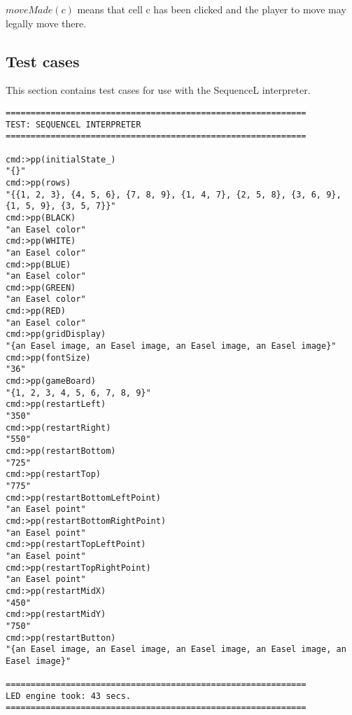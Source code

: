 \documentclass{led_doc}
\begin{document}
\begin{ledCmnt}
$moveMade(c)$ means that cell c has been clicked and the player to move may legally move there.
\end{ledCmnt}

\begin{ledDef}
\end{ledDef}

\begin{ledDef}
\end{ledDef}

\begin{ledDef}
\end{ledDef}

\begin{ledCmnt}
\section{Test cases}

This section contains test cases for use with the SequenceL interpreter.

\begin{verbatim}
============================================================
TEST: SEQUENCEL INTERPRETER
============================================================

cmd:>pp(initialState_)
"{}"
cmd:>pp(rows)
"{{1, 2, 3}, {4, 5, 6}, {7, 8, 9}, {1, 4, 7}, {2, 5, 8}, {3, 6, 9}, {1, 5, 9}, {3, 5, 7}}"
cmd:>pp(BLACK)
"an Easel color"
cmd:>pp(WHITE)
"an Easel color"
cmd:>pp(BLUE)
"an Easel color"
cmd:>pp(GREEN)
"an Easel color"
cmd:>pp(RED)
"an Easel color"
cmd:>pp(gridDisplay)
"{an Easel image, an Easel image, an Easel image, an Easel image}"
cmd:>pp(fontSize)
"36"
cmd:>pp(gameBoard)
"{1, 2, 3, 4, 5, 6, 7, 8, 9}"
cmd:>pp(restartLeft)
"350"
cmd:>pp(restartRight)
"550"
cmd:>pp(restartBottom)
"725"
cmd:>pp(restartTop)
"775"
cmd:>pp(restartBottomLeftPoint)
"an Easel point"
cmd:>pp(restartBottomRightPoint)
"an Easel point"
cmd:>pp(restartTopLeftPoint)
"an Easel point"
cmd:>pp(restartTopRightPoint)
"an Easel point"
cmd:>pp(restartMidX)
"450"
cmd:>pp(restartMidY)
"750"
cmd:>pp(restartButton)
"{an Easel image, an Easel image, an Easel image, an Easel image, an Easel image}"

============================================================
LED engine took: 43 secs.
============================================================

\end{verbatim}
\end{ledCmnt}

\hrulefill
\end{document}
